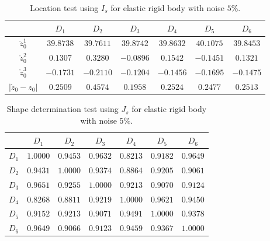 \documentclass[a4paper,11pt]{article}
\theoremstyle{remark}
\theoremstyle{definition}
\numberwithin{equation}{section}
\begin{document}
%
%

\begin{table}
\hfill{}%
\begin{tabular}{|c|c|c|c|c|c|c|}
\hline
 & $D_{1}$ & $D_{2}$ & $D_{3}$ & $D_{4}$ & $D_{5}$ & $D_{6}$\tabularnewline
\hline
\hline
$\mathring{z}_{0}^{1}$                  & $39.8738$ & $39.7611$ & $39.8742$ & $39.8632$ & $40.1075$ & $39.8453$\tabularnewline
\hline
$\mathring{z}_{0}^{2}$                  & $0.1307$  & $0.3280$  & $-0.0896$ & $0.1542$  & $-0.1451$ & $0.1321$\tabularnewline
\hline
$\mathring{z}_{0}^{3}$                  & $-0.1731$ & $-0.2110$ & $-0.1204$ & $-0.1456$ & $-0.1695$ & $-0.1475$\tabularnewline
\hline
$\left|\mathring{z}_{0}-z_{0}\right|$   & $0.2509$  & $0.4574$  & $0.1958$  & $0.2524$  & $0.2477$  & $0.2513$\tabularnewline
\hline
\end{tabular}\hfill{}

\caption{\label{tab:location-test-pec-noise}Location test using $I_{s}$  for elastic  rigid body with noise $5\%$.}
\end{table}
\begin{table}
\hfill{}%
\begin{tabular}{|c|c|c|c|c|c|c|}
\hline
 & $D_{1}$ & $D_{2}$ & $D_{3}$ & $D_{4}$ & $D_{5}$ & $D_{6}$\tabularnewline
\hline
\hline
$D_{1}$ & $\boldsymbol{1.0000}$ & $0.9453$ & $0.9632$ & $0.8213$ & $0.9182$ & $0.9649$\tabularnewline
\hline
$D_{2}$ & $0.9431$ & $\boldsymbol{1.0000}$ & $0.9374$ & $0.8864$ & $0.9205$ & $0.9061$\tabularnewline
\hline
$D_{3}$ & $0.9651$ & $0.9255$ & $\boldsymbol{1.0000}$ & $0.9213$ & $0.9070$ & $0.9124$\tabularnewline
\hline
$D_{4}$ & $0.8268$ & $0.8811$ & $0.9219$ & $\boldsymbol{1.0000}$ & $0.9621$ & $0.9450$\tabularnewline
\hline
$D_{5}$ & $0.9152$ & $0.9213$ & $0.9071$ & $0.9491$ & $\boldsymbol{1.0000}$ & $0.9378$\tabularnewline
\hline
$D_{6}$ & $0.9649$ & $0.9066$ & $0.9123$ & $0.9459$ & $0.9367$ & $\boldsymbol{1.0000}$\tabularnewline
\hline
\end{tabular}\hfill{}

\caption{\label{tab:gesture-test-pec-noise}Shape determination test using $J_{s}$  for elastic rigid body with noise $5\%$.}
\end{table}
\end{document}
